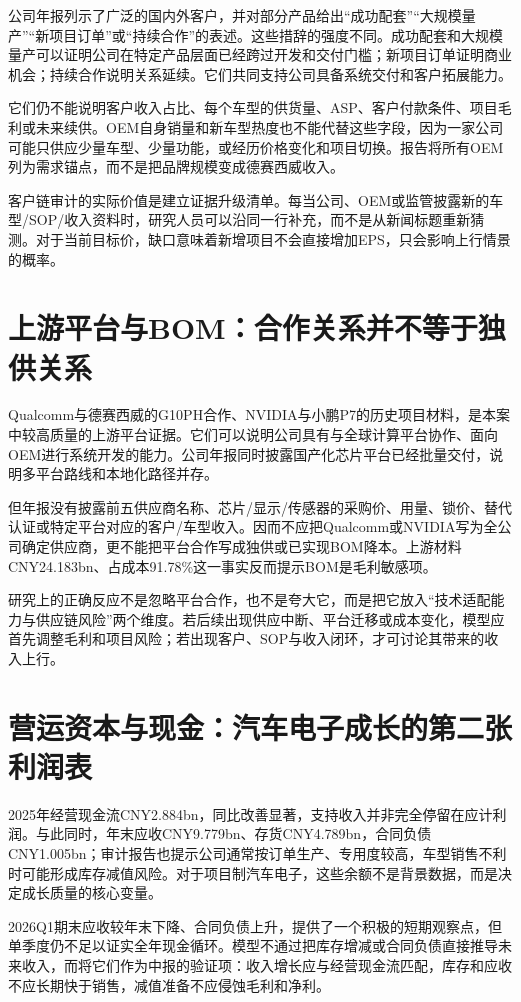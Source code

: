 公司年报列示了广泛的国内外客户，并对部分产品给出“成功配套”“大规模量产”“新项目订单”或“持续合作”的表述。这些措辞的强度不同。成功配套和大规模量产可以证明公司在特定产品层面已经跨过开发和交付门槛；新项目订单证明商业机会；持续合作说明关系延续。它们共同支持公司具备系统交付和客户拓展能力。

它们仍不能说明客户收入占比、每个车型的供货量、ASP、客户付款条件、项目毛利或未来续供。OEM自身销量和新车型热度也不能代替这些字段，因为一家公司可能只供应少量车型、少量功能，或经历价格变化和项目切换。报告将所有OEM列为需求锚点，而不是把品牌规模变成德赛西威收入。

客户链审计的实际价值是建立证据升级清单。每当公司、OEM或监管披露新的车型/SOP/收入资料时，研究人员可以沿同一行补充，而不是从新闻标题重新猜测。对于当前目标价，缺口意味着新增项目不会直接增加EPS，只会影响上行情景的概率。

\section{上游平台与BOM：合作关系并不等于独供关系}

Qualcomm与德赛西威的G10PH合作、NVIDIA与小鹏P7的历史项目材料，是本案中较高质量的上游平台证据。它们可以说明公司具有与全球计算平台协作、面向OEM进行系统开发的能力。公司年报同时披露国产化芯片平台已经批量交付，说明多平台路线和本地化路径并存。

但年报没有披露前五供应商名称、芯片/显示/传感器的采购价、用量、锁价、替代认证或特定平台对应的客户/车型收入。因而不应把Qualcomm或NVIDIA写为全公司确定供应商，更不能把平台合作写成独供或已实现BOM降本。上游材料CNY24.183bn、占成本91.78\%这一事实反而提示BOM是毛利敏感项。

研究上的正确反应不是忽略平台合作，也不是夸大它，而是把它放入“技术适配能力与供应链风险”两个维度。若后续出现供应中断、平台迁移或成本变化，模型应首先调整毛利和项目风险；若出现客户、SOP与收入闭环，才可讨论其带来的收入上行。

\section{营运资本与现金：汽车电子成长的第二张利润表}

2025年经营现金流CNY2.884bn，同比改善显著，支持收入并非完全停留在应计利润。与此同时，年末应收CNY9.779bn、存货CNY4.789bn，合同负债CNY1.005bn；审计报告也提示公司通常按订单生产、专用度较高，车型销售不利时可能形成库存减值风险。对于项目制汽车电子，这些余额不是背景数据，而是决定成长质量的核心变量。

2026Q1期末应收较年末下降、合同负债上升，提供了一个积极的短期观察点，但单季度仍不足以证实全年现金循环。模型不通过把库存增减或合同负债直接推导未来收入，而将它们作为中报的验证项：收入增长应与经营现金流匹配，库存和应收不应长期快于销售，减值准备不应侵蚀毛利和净利。

